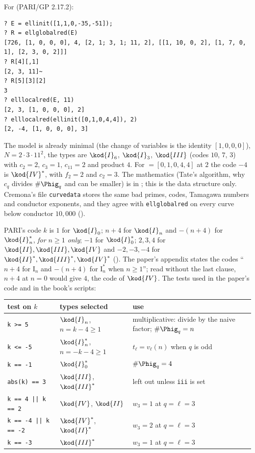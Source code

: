 \begin{sloppypar}
For  (PARI/GP 2.17.2):
\begin{lstlisting}[language=GP]
? E = ellinit([1,1,0,-35,-51]);
? R = ellglobalred(E)
[726, [1, 0, 0, 0], 4, [2, 1; 3, 1; 11, 2], [[1, 10, 0, 2], [1, 7, 0, 1], [2, 3, 0, 2]]]
? R[4][,1]
[2, 3, 11]~
? R[5][3][2]
3
? elllocalred(E, 11)
[2, 3, [1, 0, 0, 0], 2]
? elllocalred(ellinit([0,1,0,4,4]), 2)
[2, -4, [1, 0, 0, 0], 3]
\end{lstlisting}
The model is already minimal (the change of variables is the identity $[1,0,0,0]$), $N=2\cdot3\cdot11^2$, the types are $\kod{I}_6$, $\kod{I}_3$, $\kod{III}$ (codes
$10$, $7$, $3$) with $c_2=2$, $c_3=1$, $c_{11}=2$ and product $4$. For  $=[0,1,0,4,4]$ at $2$ the code $-4$ is $\kod{IV}^*$, with $f_2=2$ and
$c_2=3$. The mathematics (Tate's algorithm, why $c_q$ divides $\#\Phig_q$ and can be smaller) is in ; this is the data structure only.
Cremona's file \texttt{curvedata} stores the same bad primes, codes, Tamagawa numbers and conductor exponents, and they agree with
\texttt{ellglobalred} on every curve below conductor $10{,}000$ ().

\begin{convention}\label{conv:computation:code-idioms}
PARI's code $k$ is $1$ for $\kod{I}_0$; $n+4$ for $\kod{I}_n$ and $-(n+4)$ for $\kod{I}_n^*$, \emph{for $n\ge1$ only}; $-1$ for $\kod{I}_0^*$; $2,3,4$ for
$\kod{II},\kod{III},\kod{IV}$ and $-2,-3,-4$ for $\kod{II}^*,\kod{III}^*,\kod{IV}^*$ (). The paper's appendix states the codes ``$n+4$ for
$\mathrm{I}_n$ and $-(n+4)$ for $\mathrm{I}_n^*$ when $n\ge1$''; read without the last clause, $n+4$ at $n=0$ would give $4$, the code of $\kod{IV}$. The
tests used in the paper's code and in the book's scripts:
\begin{center}\small
\begin{tabular}{lll}
\toprule
test on $k$ & types selected & use\\
\midrule
\texttt{k >= 5} & $\kod{I}_n$, $n=k-4\ge1$ & multiplicative: divide by the naive factor; $\#\Phig_q=n$\\
\texttt{k <= -5} & $\kod{I}_n^*$, $n=-k-4\ge1$ & $t_\ell=v_\ell(n)$ when $q$ is odd\\
\texttt{k == -1} & $\kod{I}_0^*$ & $\#\Phig_q=4$\\
\texttt{abs(k) == 3} & $\kod{III}$, $\kod{III}^*$ & left out unless \texttt{iii} is set\\
\texttt{k == 4 || k == 2} & $\kod{IV}$, $\kod{II}$ & $w_3=1$ at $q=\ell=3$\\
\texttt{k == -4 || k == -2} & $\kod{IV}^*$, $\kod{II}^*$ & $w_3=2$ at $q=\ell=3$\\
\texttt{k == -3} & $\kod{III}^*$ & $w_3=1$ at $q=\ell=3$\\
\bottomrule
\end{tabular}
\end{center}
\end{convention}


\end{sloppypar}
